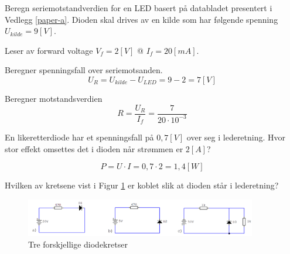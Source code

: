 \begin{question}[name=Oppgave, topic=dioder]
Beregn seriemotstandverdien for en LED basert på databladet presentert i Vedlegg \ref{paper-a}. Dioden skal drives av en kilde som har følgende spenning $U_{kilde}=9 [V]$.
\end{question}

\vspace{0.5cm} %

\begin{solution}[name=Løsningsforslag oppgave]
Leser av forward voltage $V_f=2 [V]$ @ $I_f=20[mA]$.

Beregner spenningsfall over seriemotsanden.
\[U_R=U_{kilde}-U_{LED}= 9-2=7[V]\]

Beregner motstandsverdien
\[R=\frac{U_R}{I_f}=\frac{7}{20 \cdot 10^{-3}}\]

\end{solution}








\vspace{0.5cm} %

\begin{question}[name=Oppgave, topic=dioder]
En likeretterdiode har et spenningsfall på $0,7 [V]$ over seg i lederetning. Hvor stor effekt omsettes det i dioden når strømmen er $2 [A]$?
\end{question}

\vspace{0.5cm} %


\begin{solution}[name=Løsningsforslag oppgave]
\[P=U\cdot I = 0,7\cdot2=1,4 [W]\]
	
\end{solution}

\vspace{0.5cm} %

\begin{question}[name=Oppgave, topic=dioder]
	Hvilken av kretsene vist i Figur \ref{fig:3kretser} er koblet slik at dioden står i lederetning?
	
	\begin{figure}[H]
		\centering
		\includegraphics[width=0.9\textwidth]{diode/figurer/3Kretser.png}
		\caption{Tre forskjellige diodekretser}
		\label{fig:3kretser}
	\end{figure}
	
\end{question}

